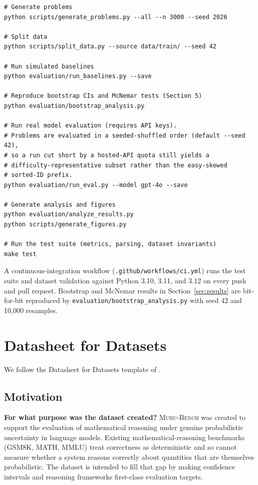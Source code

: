 \documentclass{article}
\newcommand{\muru}{\textsc{Muru-Bench}}
\begin{document}
\begin{verbatim}
# Generate problems
python scripts/generate_problems.py --all --n 3000 --seed 2026

# Split data
python scripts/split_data.py --source data/train/ --seed 42

# Run simulated baselines
python evaluation/run_baselines.py --save

# Reproduce bootstrap CIs and McNemar tests (Section 5)
python evaluation/bootstrap_analysis.py

# Run real model evaluation (requires API keys).
# Problems are evaluated in a seeded-shuffled order (default --seed 42),
# so a run cut short by a hosted-API quota still yields a
# difficulty-representative subset rather than the easy-skewed
# sorted-ID prefix.
python evaluation/run_eval.py --model gpt-4o --save

# Generate analysis and figures
python evaluation/analyze_results.py
python scripts/generate_figures.py

# Run the test suite (metrics, parsing, dataset invariants)
make test
\end{verbatim}

A continuous-integration workflow (\texttt{.github/workflows/ci.yml}) runs the test suite and dataset validation against Python 3.10, 3.11, and 3.12 on every push and pull request. Bootstrap and McNemar results in Section~\ref{sec:results} are bit-for-bit reproduced by \texttt{evaluation/bootstrap\_analysis.py} with seed 42 and 10{,}000 resamples.


\section{Datasheet for Datasets}
\label{app:datasheet}

We follow the Datasheet for Datasets template of \citet{gebru2021}.

\subsection*{Motivation}

\textbf{For what purpose was the dataset created?}
\muru{} was created to support the evaluation of mathematical reasoning under genuine probabilistic uncertainty in language models. Existing mathematical-reasoning benchmarks (GSM8K, MATH, MMLU) treat correctness as deterministic and so cannot measure whether a system reasons correctly about quantities that are themselves probabilistic. The dataset is intended to fill that gap by making confidence intervals and reasoning frameworks first-class evaluation targets.
\end{document}
